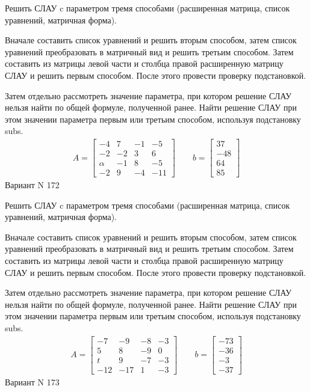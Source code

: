 \documentclass[11pt]{report}
\begin{document}
Решить СЛАУ c параметром тремя способами (расширенная матрица, список уравнений, матричная форма).

Вначале составить список уравнений и решить вторым способом,
затем список уравнений преобразовать в матричный вид и решить третьим способом.
Затем составить из матрицы левой части и столбца правой расширенную матрицу СЛАУ и решить первым способом.
После этого провести проверку подстановкой.

Затем отдельно рассмотреть значение параметра, при котором решение СЛАУ нельзя найти по общей формуле,
полученной ранее.
Найти решение СЛАУ при этом значении параметра первым или третьим способом, используя подстановку subs.
\begin{align*}
    A = \left[\begin{matrix}-4 & 7 & -1 & -5\\-2 & -2 & 3 & 6\\\alpha & -1 & 8 & -5\\-2 & 9 & -4 & -11\end{matrix}\right]
\qquad b = \left[\begin{matrix}37\\-48\\64\\85\end{matrix}\right]
\end{align*}
\newpage
Вариант N 172


Решить СЛАУ c параметром тремя способами (расширенная матрица, список уравнений, матричная форма).

Вначале составить список уравнений и решить вторым способом,
затем список уравнений преобразовать в матричный вид и решить третьим способом.
Затем составить из матрицы левой части и столбца правой расширенную матрицу СЛАУ и решить первым способом.
После этого провести проверку подстановкой.

Затем отдельно рассмотреть значение параметра, при котором решение СЛАУ нельзя найти по общей формуле,
полученной ранее.
Найти решение СЛАУ при этом значении параметра первым или третьим способом, используя подстановку subs.
\begin{align*}
    A = \left[\begin{matrix}-7 & -9 & -8 & -3\\5 & 8 & -9 & 0\\t & 9 & -7 & -3\\-12 & -17 & 1 & -3\end{matrix}\right]
\qquad b = \left[\begin{matrix}-73\\-36\\-3\\-37\end{matrix}\right]
\end{align*}
\newpage
Вариант N 173
\end{document}
